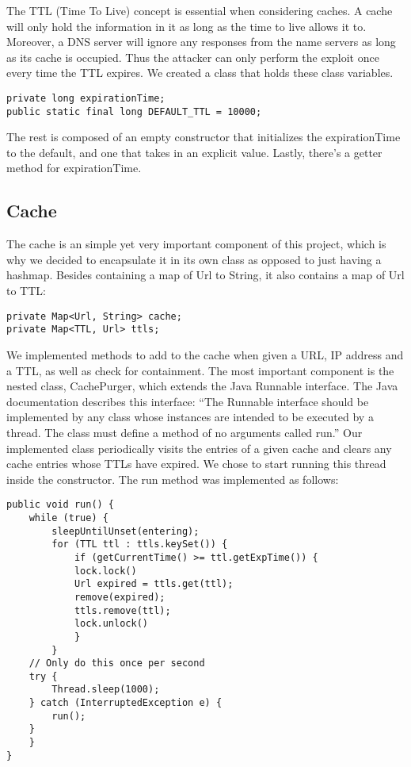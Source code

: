 \documentclass[a4paper, 12pt]{article} %
\begin{document}
The TTL (Time To Live) concept is essential when considering caches. A cache will only hold the information in it as long as the time to live allows it to. Moreover, a DNS server will ignore any responses from the name servers as long as its cache is occupied. Thus the attacker can only perform the exploit once every time the TTL expires. We created a class that holds these class variables. 

\begin{lstlisting}
private long expirationTime;
public static final long DEFAULT_TTL = 10000;
\end{lstlisting}

The rest is composed of an empty constructor that initializes the expirationTime to the default, and one that takes in an explicit value. Lastly, there's a getter method for expirationTime. 

\subsection*{Cache}

The cache is an simple yet very important component of this project, which is why we decided to encapsulate it in its own class as opposed to just having a hashmap. Besides containing a map of Url to String, it also contains a map of Url to TTL:

\begin{lstlisting}
private Map<Url, String> cache;
private Map<TTL, Url> ttls;
\end{lstlisting}

We implemented methods to add to the cache when given a URL, IP address and a TTL, as well as check for containment. The most important component is the nested class, CachePurger, which extends the Java Runnable interface. The Java documentation describes this interface: “The Runnable interface should be implemented by any class whose instances are intended to be executed by a thread. The class must define a method of no arguments called run.” Our implemented class periodically visits the entries of a given cache and clears any cache entries whose TTLs have expired. We chose to start running this thread inside the constructor. The run method was implemented as follows:

\begin{lstlisting}
public void run() {
    while (true) {
	    sleepUntilUnset(entering);
        for (TTL ttl : ttls.keySet()) {
            if (getCurrentTime() >= ttl.getExpTime()) {
            lock.lock()
            Url expired = ttls.get(ttl);
            remove(expired);
            ttls.remove(ttl);
            lock.unlock()
            }
        }
    // Only do this once per second
    try {
        Thread.sleep(1000);
    } catch (InterruptedException e) {
        run();
    }
    }
}
\end{lstlisting}
\end{document}
